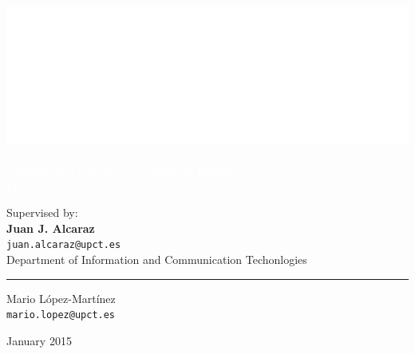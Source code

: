 \graphicspath{ {img/} }

\makeatletter                   
\def\printauthor{%
    {\large \@author}}          
\makeatother

\author{%

    }
\begin{titlingpage}
\BgThispage
{}
\vspace*{0.25\textheight}
\noindent
\includegraphics{logo.eps}\\\\ 
\textcolor{white}{\Huge\textbf{{Coexistence Policies in Cognitive Radio}}}\vspace*{0.25cm}\\
\noindent
\hspace*{1cm}\textcolor{white}{\normalsize{Ph.D. dissertation (draft)}}
\vspace*{3cm}\par
\noindent
\hspace*{3.5cm}
\begin{minipage}{0.35\linewidth}
    \begin{flushright}
    Supervised by: \\
    \textbf{Juan J. Alcaraz}\\
    \texttt{juan.alcaraz@upct.es}
    \vspace*{1cm}\\
    Department of Information and Communication Techonlogies\\
    \end{flushright}
\end{minipage} \hspace{15pt}
%
\begin{minipage}{0.02\linewidth}
    \rule{1pt}{175pt}
\end{minipage} \hspace{0pt}
%
\begin{minipage}{0.63\linewidth}
\vspace{8pt}
    \Large{Mario L\'{o}pez-Mart\'{i}nez} \\
    \large\texttt{mario.lopez@upct.es} \\
\end{minipage}
\vfill
\hspace{0.5\linewidth}January 2015
\end{titlingpage}
\restoregeometry